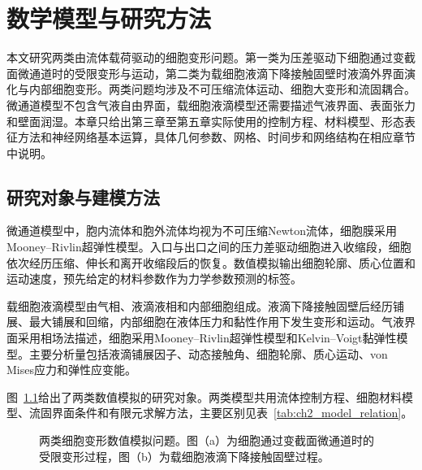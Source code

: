\chapter{数学模型与研究方法}
\label{cha:chap02}

本文研究两类由流体载荷驱动的细胞变形问题。第一类为压差驱动下细胞通过变截面微通道时的受限变形与运动，第二类为载细胞液滴下降接触固壁时液滴外界面演化与内部细胞变形。两类问题均涉及不可压缩流体运动、细胞大变形和流固耦合。微通道模型不包含气液自由界面，载细胞液滴模型还需要描述气液界面、表面张力和壁面润湿。本章只给出第三章至第五章实际使用的控制方程、材料模型、形态表征方法和神经网络基本运算，具体几何参数、网格、时间步和网络结构在相应章节中说明。

\section{研究对象与建模方法}

微通道模型中，胞内流体和胞外流体均视为不可压缩Newton流体，细胞膜采用Mooney--Rivlin超弹性模型。入口与出口之间的压力差驱动细胞进入收缩段，细胞依次经历压缩、伸长和离开收缩段后的恢复。数值模拟输出细胞轮廓、质心位置和运动速度，预先给定的材料参数作为力学参数预测的标签。

载细胞液滴模型由气相、液滴液相和内部细胞组成。液滴下降接触固壁后经历铺展、最大铺展和回缩，内部细胞在液体压力和黏性作用下发生变形和运动。气液界面采用相场法描述，细胞采用Mooney--Rivlin超弹性模型和Kelvin--Voigt黏弹性模型。主要分析量包括液滴铺展因子、动态接触角、细胞轮廓、质心运动、von Mises应力和弹性应变能。

图~\ref{fig:ch2_two_models}给出了两类数值模拟的研究对象。两类模型共用流体控制方程、细胞材料模型、流固界面条件和有限元求解方法，主要区别见表~\ref{tab:ch2_model_relation}。

\begin{figure}[htbp]
  \centering
  
  \caption{两类细胞变形数值模拟问题。图（a）为细胞通过变截面微通道时的受限变形过程，图（b）为载细胞液滴下降接触固壁过程。}
  \label{fig:ch2_two_models}
\end{figure}

